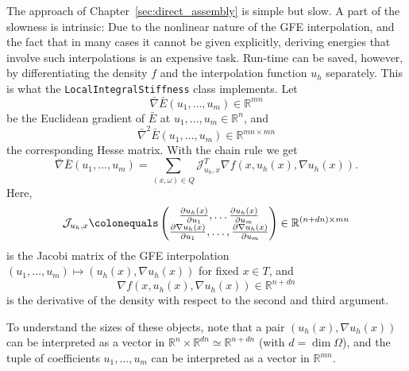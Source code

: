 \documentclass[a4paper]{article}
\newcommand{\cpp}[1]{\lstinline[basicstyle=\ttfamily]!#1!}
\newcommand{\R}{\mathbb R}
\begin{document}
The approach of Chapter~\ref{sec:direct_assembly} is simple but slow.
A part of the slowness is intrinsic: Due to the nonlinear nature of the
GFE interpolation, and the fact that in many cases it cannot be given explicitly,
deriving energies that involve such interpolations is an expensive task.
Run-time can be saved, however, by differentiating the density $f$ and the interpolation function $u_h$
separately. This is what the \cpp{LocalIntegralStiffness} class implements.
Let
\begin{equation*}
 \bar{\nabla} \bar{E}(u_1,\dots,u_m) \in \R^{mn}
\end{equation*}
be the Euclidean gradient of $\bar{E}$ at $u_1, \dots, u_m \in \R^n$, and
\begin{equation*}
 \bar{\nabla}^2 \bar{E}(u_1,\dots,u_m) \in \R^{mn \times mn}
\end{equation*}
the corresponding Hesse matrix.  With the chain rule we get
\begin{equation*}
 \bar{\nabla} \bar{E}(u_1,\dots,u_m)
 =
 \sum_{(x,\omega) \in Q} \mathcal{J}^T_{u_h,x} \nabla f(x, u_h(x), \nabla u_h(x)).
\end{equation*}
Here,
\begin{equation*}
 \mathcal J_{u_h,x}
 \colonequals
 \begin{pmatrix}
    \frac{\partial u_h(x)}{\partial u_1}, \dots \frac{\partial u_h(x)}{\partial u_m} \\
    \frac{\partial \nabla u_h(x)}{\partial u_1},
        \dots, \frac{\partial \nabla u_h(x)}{\partial u_m}
 \end{pmatrix}
 \in
 \R^{(n+dn) \times mn}
\end{equation*}
is the Jacobi matrix of the GFE interpolation $(u_1,\dots, u_m) \mapsto (u_h(x), \nabla u_h(x))$
for fixed $x \in T$, and
\begin{equation*}
 \nabla f(x, u_h(x), \nabla u_h(x))
 \in
 \R^{n+dn}
\end{equation*}
is the derivative of the density with respect to the second and third argument.

To understand the sizes of these objects, note that a pair $(u_h(x),\nabla u_h(x))$
can be interpreted as a vector in $\R^n \times \R^{dn} \simeq \R^{n+dn}$
(with $d = \dim \Omega$), and the tuple of coefficients $u_1,\dots,u_m$
can be interpreted as a vector in $\R^{mn}$.
\end{document}
